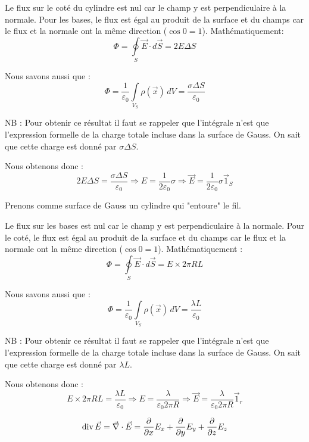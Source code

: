 \documentclass	[11pt, a4paper, openany]{book}
\begin{document}
	Le flux sur le coté du cylindre est nul car le champ y est perpendiculaire à la normale. Pour les bases, le flux est égal au produit de la surface et du champs car le flux et la normale ont la même direction ($\cos 0 = 1$). Mathématiquement: $$ \Phi = \oint \limits_S \vec E \cdot d \vec S = 2E\Delta S$$
	
	Nous savons aussi que : $$ \Phi =\dfrac{1}{\varepsilon_0} \int \limits_{V_S} \rho (\vec x) \, dV = \dfrac{\sigma \Delta S}{\varepsilon_0}$$
	
	NB : Pour obtenir ce résultat il faut se rappeler que l'intégrale n'est que l'expression formelle de la charge totale incluse dans la surface de Gauss. On sait que cette charge est donné par $\sigma \Delta S$.
	
	Nous obtenons donc : $$ 2E\Delta S = \dfrac{\sigma \Delta S}{\varepsilon_0} \Rightarrow E = \dfrac{1}{2\varepsilon_0}\sigma \Rightarrow \vec E = \dfrac{1}{2\varepsilon_0}\sigma \vec 1_S$$
	
	
	Prenons comme surface de Gauss un cylindre qui "entoure" le fil.
	
	Le flux sur les bases est nul car le champ y est perpendiculaire à la normale. Pour le coté, le flux est égal au produit de la surface et du champs car le flux et la normale ont la même direction ($\cos 0 = 1$). Mathématiquement : $$ \Phi = \oint \limits_S \vec E \cdot d \vec S = E\times 2\pi RL $$
	
	Nous savons aussi que : $$ \Phi =\dfrac{1}{\varepsilon_0} \int \limits_{V_S} \rho (\vec x) \, dV = \dfrac{\lambda L}{\varepsilon_0}$$
	
	NB : Pour obtenir ce résultat il faut se rappeler que l'intégrale n'est que l'expression formelle de la charge totale incluse dans la surface de Gauss. On sait que cette charge est donné par $\lambda L$.
	
	Nous obtenons donc : $$ E\times 2\pi RL = \dfrac{\lambda L}{\varepsilon_0} \Rightarrow E = \dfrac{\lambda}{\varepsilon_0 2 \pi R} \Rightarrow \vec E = \dfrac{\lambda}{\varepsilon_0 2 \pi R} \vec 1_r $$
	
	
	$$ \text{div}\,\E = \vec \nabla \cdot \E = \dfrac{\partial}{\partial x} E_x + \dfrac{\partial}{\partial y} E_y + \dfrac{\partial}{\partial z} E_z$$
	
\end{document}
